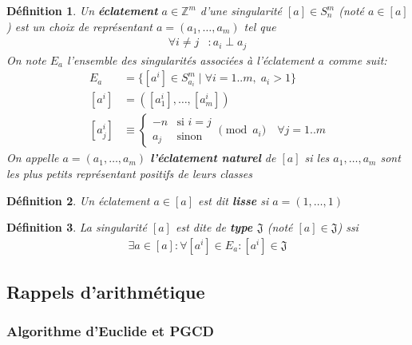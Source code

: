 \documentclass{article}
\newtheorem{definition}{Définition}
\begin{document}
\begin{definition}
    Un \textbf{éclatement} $a \in \mathbb{Z}^m$ d'une singularité $[a] \in S_n^m$ (noté $a \in [a]$) est un choix de 
    représentant $a = (a_1, \dots, a_m)$ tel que
    \begin{align*}
        \forall i \neq j & : a_i \perp a_j
    \end{align*}
    On note $E_a$ l'ensemble des singularités associées à l'éclatement $a$ comme suit:
    \begin{align*}
        E_a & = \{ [a^i] \in S_{a_i}^m \mid \forall i = 1..m,\; a_i > 1 \} \\
        [a^i] & = ([a^i_1], \dots, [a^i_m]) \\
        [a^i_j] & \equiv \begin{cases}
            -n & \text{si $i = j$} \\
            a_j & \text{sinon}
        \end{cases} \pmod{a_i} \quad \forall j = 1..m
    \end{align*}
    On appelle $a = (a_1, \dots, a_m)$ \textbf{l'éclatement naturel} de $[a]$ si 
    les $a_1, \dots, a_m$ sont les plus petits représentant positifs de leurs classes
\end{definition}

\begin{definition}
    Un éclatement $a \in [a]$ est dit \textbf{lisse} si $a = (1, \dots, 1)$
\end{definition}

\begin{definition}
    La singularité $[a]$ est dite de \textbf{type $\mathfrak{J}$} (noté $[a] \in \mathfrak{J}$) ssi
    \begin{align*}
        \exists a \in [a] : \forall [a^i] \in E_a : [a^i] \in \mathfrak{J}
    \end{align*}
\end{definition}

\newpage

\subsection{Rappels d'arithmétique}

\subsubsection{Algorithme d'Euclide et PGCD}
\end{document}
